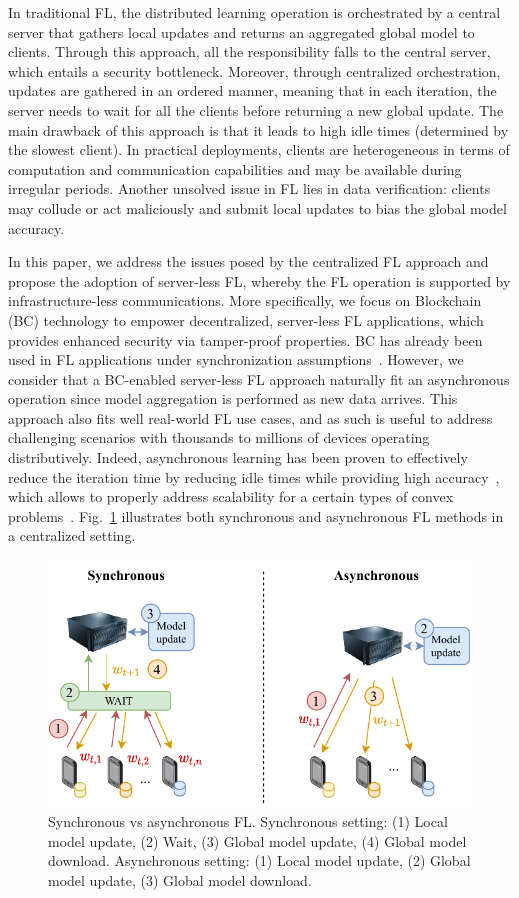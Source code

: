 \documentclass[10pt,journal,compsoc]{IEEEtran}
\begin{document}
In traditional FL, the distributed learning operation is orchestrated by a central server that gathers local updates and returns an aggregated global model to clients. Through this approach, all the responsibility falls to the central server, which entails a security bottleneck. Moreover, through centralized orchestration, updates are gathered in an ordered manner, meaning that in each iteration, the server needs to wait for all the clients before returning a new global update. The main drawback of this approach is that it leads to high idle times (determined by the slowest client). In practical deployments, clients are heterogeneous in terms of computation and communication capabilities and may be available during irregular periods. Another unsolved issue in FL lies in data verification: clients may collude or act maliciously and submit local updates to bias the global model accuracy.

In this paper, we address the issues posed by the centralized FL approach and propose the adoption of server-less FL, whereby the FL operation is supported by infrastructure-less communications. More specifically, we focus on Blockchain (BC) technology to empower decentralized, server-less FL applications, which provides enhanced security via tamper-proof properties. BC has already been used in FL applications under synchronization assumptions~\cite{kim2019blockchained}. However, we consider that a BC-enabled server-less FL approach naturally fit an asynchronous operation since model aggregation is performed as new data arrives. This approach also fits well real-world FL use cases, and as such is useful to address challenging scenarios with thousands to millions of devices operating distributively. Indeed, asynchronous learning has been proven to effectively reduce the iteration time by reducing idle times while providing high accuracy~\cite{sprague2018asynchronous}, which allows to properly address scalability for a certain types of convex problems~\cite{feyzmahdavian2016asynchronous}. Fig.~\ref{fig:sync_vs_async_diagram} illustrates both synchronous and asynchronous FL methods in a centralized setting.

\begin{figure}[ht!]
	\centering
	\includegraphics[width=.85\linewidth]{img/sync_vs_async_diagram.pdf}
	\caption{Synchronous vs asynchronous FL. Synchronous setting: (1) Local model update, (2) Wait, (3) Global model update, (4) Global model download. Asynchronous setting: (1) Local model update, (2) Global model update, (3) Global model download.}
	\label{fig:sync_vs_async_diagram}
\end{figure}
\end{document}
